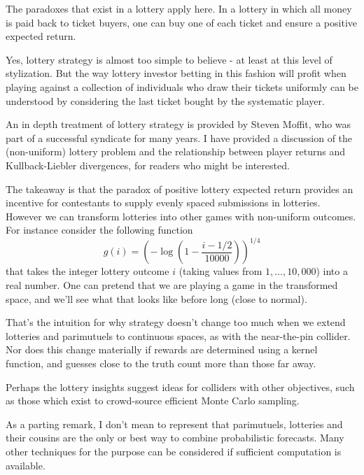 The paradoxes that exist in a lottery apply here. In a lottery in which all money is paid back to ticket buyers, one can buy one of each ticket and ensure a positive expected return. 

Yes, lottery strategy is almost too simple to believe - at least at this level of stylization. But the way lottery investor betting in this fashion will profit when playing against a collection of individuals who draw their tickets uniformly can be understood by considering the last ticket bought by the systematic player.  

An in depth treatment of lottery strategy is provided by Steven Moffit, who was part of a successful syndicate for many years. I have provided a discussion of the (non-uniform) lottery problem and the relationship between player returns and Kullback-Liebler divergences, for readers who might be interested.

The takeaway is that the paradox of positive lottery expected return provides an incentive for contestants to supply evenly spaced submissions in lotteries. However we can transform lotteries into other games with non-uniform outcomes. For instance consider the following function
\begin{equation}
       g(i) = \left(
               - \log \left( 1 - \frac{i-1/2}{10000}
                       \right) 
       \right)^{1/4}
       \label{eqn:gi}
\end{equation}
that takes the integer lottery outcome $i$ (taking values from $1,\dots,10,000$) into a real number. One can pretend that we are playing a game in the transformed space, and we'll see what that looks like before long (close to normal).

That's the intuition for why strategy doesn't change too much when we extend lotteries and parimutuels to continuous spaces, as with the near-the-pin collider. Nor does this change materially if rewards are determined using a kernel function, and guesses close to the truth count more than those far away.

Perhaps the lottery insights suggest ideas for colliders with other objectives, such as those which exist to crowd-source efficient Monte Carlo sampling. 

As a parting remark, I don't mean to represent that parimutuels, lotteries and their cousins are the only or best way to combine probabilistic forecasts. Many other techniques for the purpose can be considered if sufficient computation is available. 

